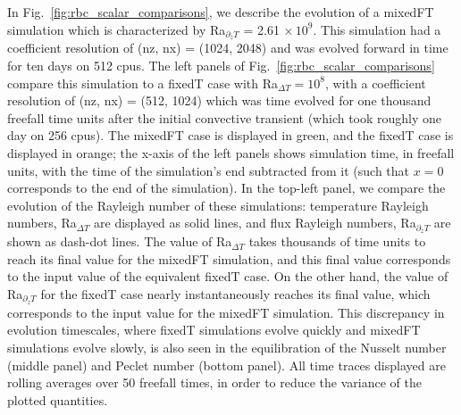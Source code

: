 \documentclass[aps, pre, onecolumn, nofootinbib, notitlepage, groupedaddress, amsfonts, amssymb, amsmath, longbibliography]{revtex4-1}
\begin{document}
In Fig.~\ref{fig:rbc_scalar_comparisons}, we describe the evolution of a mixedFT simulation which is characterized by Ra$_{\partial_z T}$ = 2.61$\,\times 10^9$.
This simulation had a coefficient resolution of (nz, nx) = (1024, 2048) and was evolved forward in time for ten days on 512 cpus.
The left panels of Fig.~\ref{fig:rbc_scalar_comparisons} compare this simulation to a fixedT case with Ra$_{\Delta T} = 10^8$, with a coefficient resolution of (nz, nx) = (512, 1024) which was time evolved for one thousand freefall time units after the initial convective transient (which took roughly one day on 256 cpus).
The mixedFT case is displayed in green, and the fixedT case is displayed in orange; the x-axis of the left panels shows simulation time, in freefall units, with the time of the simulation's end subtracted from it (such that $x = 0$ corresponds to the end of the simulation).
In the top-left panel, we compare the evolution of the Rayleigh number of these simulations: temperature Rayleigh numbers, Ra$_{\Delta T}$ are displayed as solid lines, and flux Rayleigh numbers, Ra$_{\partial_z T}$ are shown as dash-dot lines.
The value of Ra$_{\Delta T}$ takes thousands of time units to reach its final value for the mixedFT simulation, and this final value corresponds to the input value of the equivalent fixedT case.
On the other hand, the value of Ra$_{\partial_z T}$ for the fixedT case nearly instantaneously reaches its final value, which corresponds to the input value for the mixedFT simulation.
This discrepancy in evolution timescales, where fixedT simulations evolve quickly and mixedFT simulations evolve slowly, is also seen in the equilibration of the Nusselt number (middle panel) and Peclet number (bottom panel).
All time traces displayed are rolling averages over 50 freefall times, in order to reduce the variance of the plotted quantities.
\end{document}

